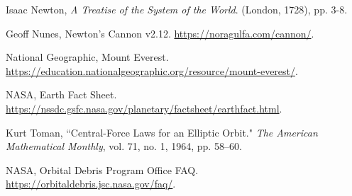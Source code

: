\documentclass[aps,twocolumn]{revtex4-1}
\begin{document}
\begin{thebibliography}{9}

 Isaac Newton, \textit{A Treatise of the System of the World}. (London, 1728), pp. 3-8.

 Geoff Nunes, Newton's Cannon v2.12. \url{https://noragulfa.com/cannon/}.

 National Geographic, Mount Everest. \url{https://education.nationalgeographic.org/resource/mount-everest/}.

 NASA, Earth Fact Sheet. \url{https://nssdc.gsfc.nasa.gov/planetary/factsheet/earthfact.html}.

 Kurt Toman, ``Central-Force Laws for an Elliptic Orbit." \textit{The American Mathematical Monthly}, vol. 71, no. 1, 1964, pp. 58–60.

 NASA, Orbital Debris Program Office FAQ. \url{https://orbitaldebris.jsc.nasa.gov/faq/}.

\end{thebibliography}
\end{document}
